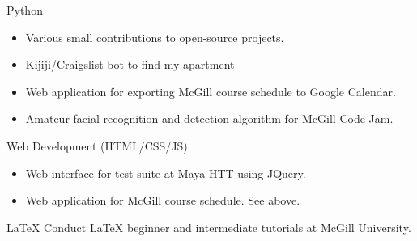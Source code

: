 \begin{entrylist}
\entry
{}
{Python}
{}
{\vspace{-\baselineskip}
\begin{itemize}[leftmargin=*]
\item Various small contributions to open-source projects.
\item Kijiji/Craigslist bot to find my apartment
\item Web application for exporting McGill course schedule to Google Calendar.
\item Amateur facial recognition and detection algorithm for McGill Code Jam.
\end{itemize}
}
\entry
{}
{Web Development (HTML/CSS/JS)}
{}
{\vspace{-\baselineskip}
\begin{itemize}[leftmargin=*]
\item Web interface for test suite at Maya HTT using JQuery.
\item Web application for McGill course schedule. See above.
\end{itemize}
}
\entry
{}
{LaTeX}
{%
}
{Conduct \LaTeX{} beginner and intermediate tutorials at McGill University.
}
\end{entrylist}




